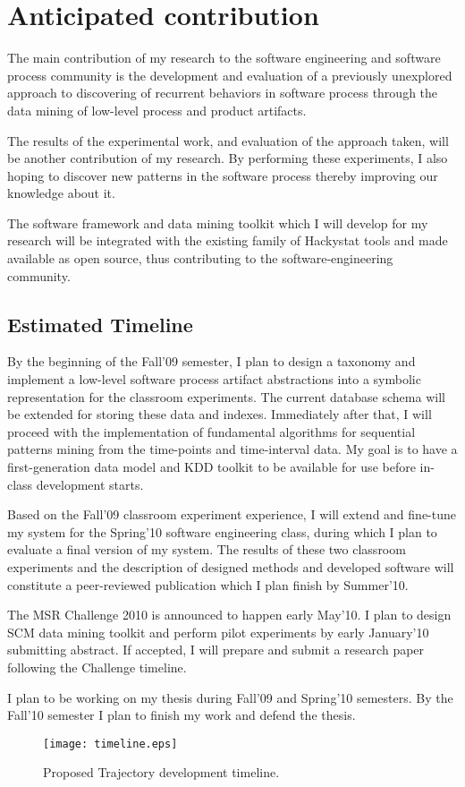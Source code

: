 \chapter{Anticipated contribution} \label{contribution}
The main contribution of my research to the software engineering and software process community is the development and evaluation of a previously unexplored approach to discovering of recurrent behaviors in software process through the data mining of low-level process and product artifacts.

The results of the experimental work, and evaluation of the approach taken, will be another contribution of my research. By performing these experiments, I also hoping to discover new patterns in the software process thereby improving our knowledge about it.

The software framework and data mining toolkit which I will develop for my research will be integrated with the existing family of Hackystat tools and made available as open source, thus contributing to the software-engineering community.

\section{Estimated Timeline}
By the beginning of the Fall'09 semester, I plan to design a taxonomy and implement a low-level software process artifact abstractions into a symbolic representation for the classroom experiments. The current database schema will be extended for storing these data and indexes. Immediately after that, I will proceed with the implementation of fundamental algorithms for sequential patterns mining from the time-points and time-interval data. My goal is to have a first-generation data model and KDD toolkit to be available for use before in-class development starts. 

Based on the Fall'09 classroom experiment experience, I will extend and fine-tune my system for the Spring'10 software engineering class, during which I plan to evaluate a final version of my system. The results of these two classroom experiments and the description of designed methods and developed software will constitute a peer-reviewed publication which I plan finish by Summer'10.

The MSR Challenge 2010 is announced to happen early May'10. I plan to design SCM data mining toolkit and perform pilot experiments by early January'10 submitting abstract. If accepted, I will prepare and submit a research paper following the Challenge timeline.

I plan to be working on my thesis during Fall'09 and Spring'10 semesters. By the Fall'10 semester I plan to finish my work and defend the thesis.

\begin{figure}[tbp]
   \centering
   \texttt{[image: timeline.eps]}
   \caption{Proposed Trajectory development timeline.}
   \label{fig:timeline}
\end{figure}
